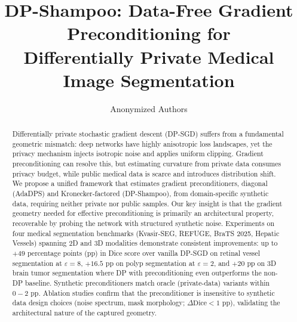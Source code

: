\documentclass[runningheads]{llncs}
\begin{document}
\title{DP-Shampoo: Data-Free Gradient Preconditioning for\\ Differentially Private Medical Image Segmentation}

\author{Anonymized Authors}

\maketitle

\begin{abstract}
Differentially private stochastic gradient descent (DP-SGD) suffers from a fundamental geometric mismatch: deep networks have highly anisotropic loss landscapes, yet the privacy mechanism injects isotropic noise and applies uniform clipping. Gradient preconditioning can resolve this, but estimating curvature from private data consumes privacy budget, while public medical data is scarce and introduces distribution shift. We propose a unified framework that estimates gradient preconditioners, diagonal (AdaDPS) and Kronecker-factored (DP-Shampoo), from domain-specific synthetic data, requiring neither private nor public samples. Our key insight is that the gradient geometry needed for effective preconditioning is primarily an architectural property, recoverable by probing the network with structured synthetic noise. Experiments on four medical segmentation benchmarks (Kvasir-SEG, REFUGE, BraTS 2025, Hepatic Vessels) spanning 2D and 3D modalities demonstrate consistent improvements: up to $+49$ percentage points (pp) in Dice score over vanilla DP-SGD on retinal vessel segmentation at $\varepsilon{=}8$, $+16.5$ pp on polyp segmentation at $\varepsilon{=}2$, and $+20$ pp on 3D brain tumor segmentation where DP with preconditioning even outperforms the non-DP baseline. Synthetic preconditioners match oracle (private-data) variants within $0{-}2$ pp. Ablation studies confirm that the preconditioner is insensitive to synthetic data design choices (noise spectrum, mask morphology; $\Delta\text{Dice}{<}1$ pp), validating the architectural nature of the captured geometry.

\end{abstract}
\end{document}
